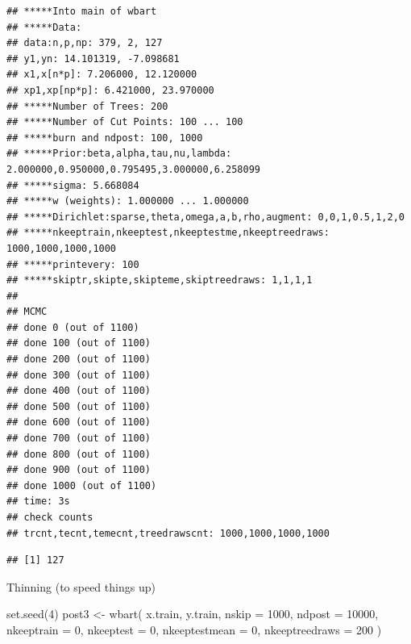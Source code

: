 \documentclass[
]{book}
\newenvironment{Shaded}{\begin{snugshade}}{\end{snugshade}}
\newcommand{\AttributeTok}[1]{\textcolor[rgb]{0.77,0.63,0.00}{#1}}
\newcommand{\DecValTok}[1]{\textcolor[rgb]{0.00,0.00,0.81}{#1}}
\newcommand{\FunctionTok}[1]{\textcolor[rgb]{0.00,0.00,0.00}{#1}}
\newcommand{\NormalTok}[1]{#1}
\newcommand{\OtherTok}[1]{\textcolor[rgb]{0.56,0.35,0.01}{#1}}
\newcommand{\SpecialCharTok}[1]{\textcolor[rgb]{0.00,0.00,0.00}{#1}}
\begin{document}
\begin{verbatim}
## *****Into main of wbart
## *****Data:
## data:n,p,np: 379, 2, 127
## y1,yn: 14.101319, -7.098681
## x1,x[n*p]: 7.206000, 12.120000
## xp1,xp[np*p]: 6.421000, 23.970000
## *****Number of Trees: 200
## *****Number of Cut Points: 100 ... 100
## *****burn and ndpost: 100, 1000
## *****Prior:beta,alpha,tau,nu,lambda: 2.000000,0.950000,0.795495,3.000000,6.258099
## *****sigma: 5.668084
## *****w (weights): 1.000000 ... 1.000000
## *****Dirichlet:sparse,theta,omega,a,b,rho,augment: 0,0,1,0.5,1,2,0
## *****nkeeptrain,nkeeptest,nkeeptestme,nkeeptreedraws: 1000,1000,1000,1000
## *****printevery: 100
## *****skiptr,skipte,skipteme,skiptreedraws: 1,1,1,1
## 
## MCMC
## done 0 (out of 1100)
## done 100 (out of 1100)
## done 200 (out of 1100)
## done 300 (out of 1100)
## done 400 (out of 1100)
## done 500 (out of 1100)
## done 600 (out of 1100)
## done 700 (out of 1100)
## done 800 (out of 1100)
## done 900 (out of 1100)
## done 1000 (out of 1100)
## time: 3s
## check counts
## trcnt,tecnt,temecnt,treedrawscnt: 1000,1000,1000,1000
\end{verbatim}

\begin{Shaded}
\end{Shaded}

\begin{verbatim}
## [1] 127
\end{verbatim}

Thinning (to speed things up)

\begin{Shaded}
\begin{Highlighting}[]
\FunctionTok{set.seed}\NormalTok{(}\DecValTok{4}\NormalTok{)}
\NormalTok{post3 }\OtherTok{\textless{}{-}}
    \FunctionTok{wbart}\NormalTok{(}
\NormalTok{        x.train,}
\NormalTok{        y.train,}
        \AttributeTok{nskip =} \DecValTok{1000}\NormalTok{,}
        \AttributeTok{ndpost =} \DecValTok{10000}\NormalTok{,}
        \AttributeTok{nkeeptrain =} \DecValTok{0}\NormalTok{,}
        \AttributeTok{nkeeptest =} \DecValTok{0}\NormalTok{,}
        \AttributeTok{nkeeptestmean =} \DecValTok{0}\NormalTok{,}
        \AttributeTok{nkeeptreedraws =} \DecValTok{200}
\NormalTok{    )}
\end{Highlighting}
\end{Shaded}
\end{document}
